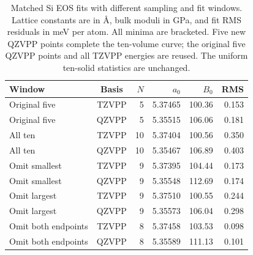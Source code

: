 \begin{table}[htbp]
\centering\small
\caption{Matched Si EOS fits with different sampling and fit windows. Lattice constants are in \AA{}, bulk moduli in GPa, and fit RMS residuals in meV per atom. All minima are bracketed. Five new QZVPP points complete the ten-volume curve; the original five QZVPP points and all TZVPP energies are reused. The uniform ten-solid statistics are unchanged.}
\label{tab:si-eos-extension}
\begin{tabular}{lcrrrr}
\toprule
Window & Basis & $N$ & $a_0$ & $B_0$ & RMS\\
\midrule
Original five & TZVPP & 5 & 5.37465 & 100.36 & 0.153\\
Original five & QZVPP & 5 & 5.35515 & 106.06 & 0.181\\
All ten & TZVPP & 10 & 5.37404 & 100.56 & 0.350\\
All ten & QZVPP & 10 & 5.35467 & 106.89 & 0.403\\
Omit smallest & TZVPP & 9 & 5.37395 & 104.44 & 0.173\\
Omit smallest & QZVPP & 9 & 5.35548 & 112.69 & 0.174\\
Omit largest & TZVPP & 9 & 5.37510 & 100.55 & 0.244\\
Omit largest & QZVPP & 9 & 5.35573 & 106.04 & 0.298\\
Omit both endpoints & TZVPP & 8 & 5.37458 & 103.53 & 0.098\\
Omit both endpoints & QZVPP & 8 & 5.35589 & 111.13 & 0.101\\
\bottomrule
\end{tabular}
\end{table}

